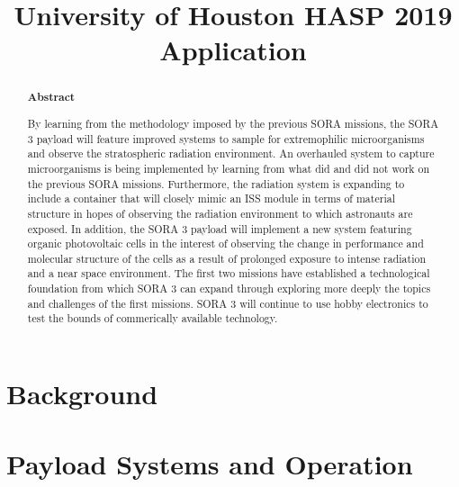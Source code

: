 \documentclass[aps,superscriptaddress,floatfix,nofootinbib,showpacs,amsmath,amssymb,altaffilletter,floatfix,onecolumn]{revtex4-1}
\begin{document}
\title{University of Houston HASP 2019 Application}

\begin{abstract}
  \begin{center}
    {\bf Abstract}
  \end{center}

  By learning from the methodology imposed by the previous SORA missions, the SORA 3 payload will feature improved systems to sample for extremophilic microorganisms and observe the stratospheric radiation environment.
  An overhauled system to capture microorganisms is being implemented by learning from what did and did not work on the previous SORA missions.
  Furthermore, the radiation system is expanding to include a container that will closely mimic an ISS module in terms of material structure in hopes of observing the radiation environment to which astronauts are exposed.
  In addition, the SORA 3 payload will implement a new system featuring organic photovoltaic cells in the interest of observing the change in performance and molecular structure of the cells as a result of prolonged exposure to intense radiation and a near space environment.
  The first two missions have established a technological foundation from which SORA 3 can expand through exploring more deeply the topics and challenges of the first missions. SORA 3 will continue to use hobby electronics to test the bounds of commerically available technology.
  
  \newpage %
\end{abstract}


\setlength{\parindent}{1em}
\setdefaultleftmargin{1em}{1em}{}{}{}{}
\setcounter{page}{0}\thispagestyle{empty}
\maketitle
\onecolumngrid
\setcounter{tocdepth}{2}
\setcounter{page}{0}\thispagestyle{empty}
\tableofcontents
\setcounter{page}{0}\thispagestyle{empty}
\newpage


\section{Background}
    
    

\section{Payload Systems and Operation}
\label{sec:PayloadSystems}
    
    
    
    
\end{document}
